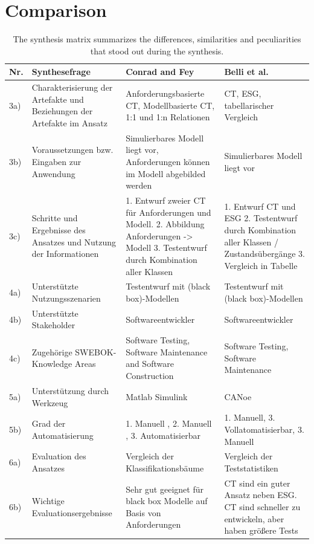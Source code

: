 \section{Comparison}
\label{Kap:Comparison}

\begin{table}[t] 
\centering
\begin{small}

\caption{The synthesis matrix summarizes the differences, similarities and peculiarities that stood out during the synthesis.}
\label{tab:synthesematrix_julian}

\setlength{\tabcolsep}{1em}

\begin{tabular}{ | p{0.2cm} p{3cm} p{4.5cm} p{4.5cm} }
	\hline
	\textbf{Nr.} & \textbf{Synthesefrage} & \textbf{Conrad and Fey} & 			\textbf{Belli et al.} \\
	\hline
	\hline	
	3a) & Charakterisierung der Artefakte und Beziehungen der Artefakte im Ansatz & Anforderungsbasierte CT, Modellbasierte CT,  1:1 und 1:n Relationen & CT, ESG, tabellarischer Vergleich \\
	\hline	
	3b) & Voraussetzungen bzw. Eingaben zur Anwendung & Simulierbares Modell liegt vor, Anforderungen können im Modell abgebilded werden & Simulierbares Modell liegt vor \\
	\hline	
	3c) & Schritte und Ergebnisse des Ansatzes und Nutzung der Informationen & 1. Entwurf zweier CT für Anforderungen und Modell. 2. Abbildung Anforderungen -> Modell 3. Testentwurf durch Kombination aller Klassen & 1. Entwurf CT und ESG 2. Testentwurf durch Kombination aller Klassen / Zustandsübergänge 3. Vergleich in Tabelle \\
	\hline	
	4a) & Unterstützte Nutzungsszenarien & Testentwurf mit (black box)-Modellen & Testentwurf mit (black box)-Modellen \\
	\hline	
	4b) & Unterstützte Stakeholder & Softwareentwickler & Softwareentwickler \\
	\hline	
	4c) & Zugehörige SWEBOK-Knowledge Areas & Software Testing, Software Maintenance and Software Construction & Software Testing, Software Maintenance \\
	\hline
	5a) & Unterstützung durch Werkzeug & Matlab Simulink & CANoe \\
	\hline
	5b) & Grad der Automatisierung & 1. Manuell , 2. Manuell , 3. Automatisierbar & 1. Manuell, 3. Vollatomatisierbar, 3. Manuell \\
	\hline	
	6a) & Evaluation des Ansatzes & Vergleich der Klassifikationsbäume & 
	Vergleich der Teststatistiken  \\
	\hline	
	6b) & Wichtige Evaluationsergebnisse & Sehr gut geeignet für black box Modelle auf Basis von Anforderungen & CT sind ein guter Ansatz neben ESG. CT sind schneller zu entwickeln, aber haben größere Tests \\
	\hline	
\end{tabular}
\end{small}
\end{table}


